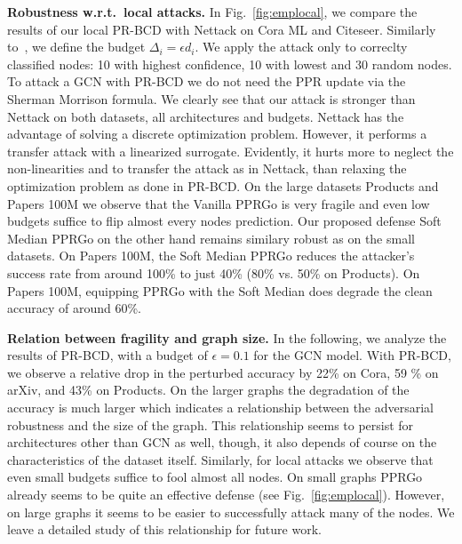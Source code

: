 \documentclass[sigconf, review]{acmart}
\begin{document}

\textbf{Robustness w.r.t.\ local attacks.} In Fig.~\ref{fig:emplocal}, we compare the results of our local PR-BCD with Nettack on Cora ML and Citeseer. Similarly to~\citet{Zugner2018}, we define the budget \(\Delta_i = \epsilon d_i\). We apply the attack only to correclty classified nodes: 10 with highest confidence, 10 with lowest and 30 random nodes. To attack a GCN with PR-BCD we do not need the PPR update via the Sherman Morrison formula. We clearly see that our attack is stronger than Nettack on both datasets, all architectures and budgets. Nettack has the advantage of solving a discrete optimization problem. However, it performs a transfer attack with a linearized surrogate. Evidently, it hurts more to neglect the non-linearities and to transfer the attack as in Nettack, than relaxing the optimization problem as done in PR-BCD. On the large datasets Products and Papers 100M we observe that the Vanilla PPRGo is very fragile and even low budgets suffice to flip almost every nodes prediction. Our proposed defense Soft Median PPRGo on the other hand remains similary robust as on the small datasets. 
On Papers 100M, the Soft Median PPRGo reduces the attacker's success rate from around 100\% to just 40\% (80\% vs. 50\% on Products). On Papers 100M, equipping PPRGo with the Soft Median does degrade the clean accuracy of around 60\%.

\textbf{Relation between fragility and graph size.} In the following, we analyze the results of PR-BCD, with a budget of \(\epsilon=0.1\) for the GCN model. With PR-BCD, we observe a relative drop in the perturbed accuracy by 22\% on Cora, 59 \% on arXiv, and 43\% on Products. On the larger graphs the degradation of the accuracy is much larger which indicates a relationship between the adversarial robustness and the size of the graph. This relationship seems to persist for architectures other than GCN as well, though, it also depends of course on the characteristics of the dataset itself. Similarly, for local attacks we observe that even small budgets suffice to fool almost all nodes. On small graphs PPRGo already seems to be quite an effective defense (see Fig.~\ref{fig:emplocal}). However, on large graphs it seems to be easier to successfully attack many of the nodes. We leave a detailed study of this relationship for future work.
\end{document}
